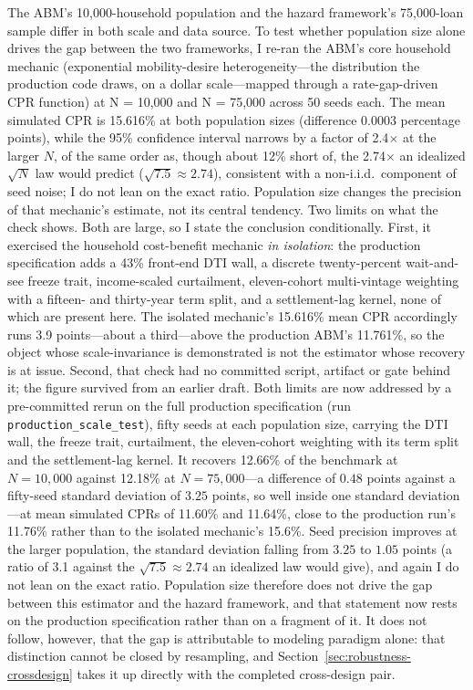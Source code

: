 \documentclass[12pt]{article}
\begin{document}
The ABM's 10,000-household population and the hazard framework's 75,000-loan sample differ in both scale and data source. To test whether population size alone drives the gap between the two frameworks, I re-ran the ABM's core household mechanic (exponential mobility-desire heterogeneity---the distribution the production code draws, on a dollar scale---mapped through a rate-gap-driven CPR function) at N = 10,000 and N = 75,000 across 50 seeds each. The mean simulated CPR is 15.616\% at both population sizes (difference 0.0003 percentage points), while the 95\% confidence interval narrows by a factor of 2.4$\times$ at the larger $N$, of the same order as, though about 12\% short of, the 2.74$\times$ an idealized $\sqrt{N}$ law would predict ($\sqrt{7.5} \approx 2.74$), consistent with a non-i.i.d.\ component of seed noise; I do not lean on the exact ratio. Population size changes the precision of that mechanic's estimate, not its central tendency. Two limits on what the check shows. Both are large, so I state the conclusion conditionally. First, it exercised the household cost-benefit mechanic \emph{in isolation}: the production specification adds a 43\% front-end DTI wall, a discrete twenty-percent wait-and-see freeze trait, income-scaled curtailment, eleven-cohort multi-vintage weighting with a fifteen- and thirty-year term split, and a settlement-lag kernel, none of which are present here. The isolated mechanic's 15.616\% mean CPR accordingly runs 3.9 points---about a third---above the production ABM's 11.761\%, so the object whose scale-invariance is demonstrated is not the estimator whose recovery is at issue. Second, that check had no committed script, artifact or gate behind it; the figure survived from an earlier draft. Both limits are now addressed by a pre-committed rerun on the full production specification (run \texttt{production\_scale\_test}), fifty seeds at each population size, carrying the DTI wall, the freeze trait, curtailment, the eleven-cohort weighting with its term split and the settlement-lag kernel. It recovers 12.66\% of the benchmark at $N = 10{,}000$ against 12.18\% at $N = 75{,}000$---a difference of $0.48$ points against a fifty-seed standard deviation of $3.25$ points, so well inside one standard deviation---at mean simulated CPRs of 11.60\% and 11.64\%, close to the production run's 11.76\% rather than to the isolated mechanic's 15.6\%. Seed precision improves at the larger population, the standard deviation falling from $3.25$ to $1.05$ points (a ratio of 3.1 against the $\sqrt{7.5} \approx 2.74$ an idealized law would give), and again I do not lean on the exact ratio. Population size therefore does not drive the gap between this estimator and the hazard framework, and that statement now rests on the production specification rather than on a fragment of it. It does not follow, however, that the gap is attributable to modeling paradigm alone: that distinction cannot be closed by resampling, and Section~\ref{sec:robustness-crossdesign} takes it up directly with the completed cross-design pair.
\end{document}
